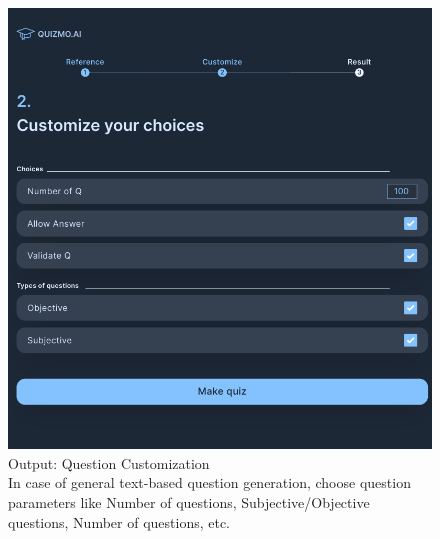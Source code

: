 \documentclass[12pt]{report}
\begin{document}
\begin{figure}[ht!]
    \centering
    \includegraphics[scale = 0.4]{Images/QuestionCustomization.png}
    \captionsetup{justification=centering} 
    \caption{Output: Question Customization \\ In case of general text-based question generation, choose question parameters like Number of questions, Subjective/Objective questions, Number of questions, etc.}
\end{figure}
\end{document}
